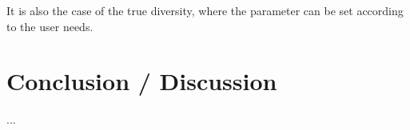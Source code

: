 It is also the case of the true diversity, where the parameter  can be set according to the user needs.

\section{Conclusion / Discussion}

...








\address{Miguel R. Guevara\\
  Universidad de Playa Ancha and Universidad Federico Santa María\\
  Valparaíso\\
  Chile\\}

\address{Dominik Hartmann\\
  Chair for Economics of Innovation, University of Hohenheim\\
  Wollgrasweg 23, 70599, Stuttgart\\
  Germany\\}

\address{Marcelo Mendoza\\
  Universidad Federico Santa María\\
  Av. Vicuna Mackenna 3939, San Joaquin, Santiago\\
  Chile\\}


